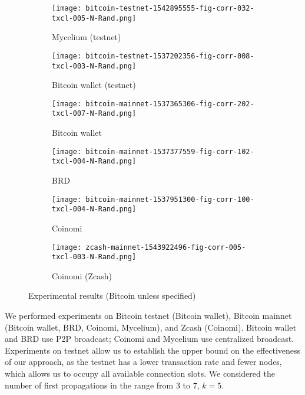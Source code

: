 \begin{figure}
	\centering
	\begin{subfigure}{.5\textwidth}
		\centering
		\texttt{[image: bitcoin-testnet-1542895555-fig-corr-032-txcl-005-N-Rand.png]}
		\caption{Mycelium (testnet)}
	\end{subfigure}%
	\begin{subfigure}{.5\textwidth}
		\centering
		\texttt{[image: bitcoin-testnet-1537202356-fig-corr-008-txcl-003-N-Rand.png]}
		\caption{Bitcoin wallet (testnet)}
	\end{subfigure}
	\begin{subfigure}{.5\textwidth}
		\centering
		\texttt{[image: bitcoin-mainnet-1537365306-fig-corr-202-txcl-007-N-Rand.png]}
		\caption{Bitcoin wallet}
	\end{subfigure}%
	\begin{subfigure}{.5\textwidth}
		\centering
		\texttt{[image: bitcoin-mainnet-1537377559-fig-corr-102-txcl-004-N-Rand.png]}
		\caption{BRD}
	\end{subfigure}
	\begin{subfigure}{.5\textwidth}
		\centering
		\texttt{[image: bitcoin-mainnet-1537951300-fig-corr-100-txcl-004-N-Rand.png]}
		\caption{Coinomi}
	\end{subfigure}%
	\begin{subfigure}{.5\textwidth}
		\centering
		\texttt{[image: zcash-mainnet-1543922496-fig-corr-005-txcl-003-N-Rand.png]}
		\caption{Coinomi (Zcash)}
	\end{subfigure}
	\caption[short]{Experimental results (Bitcoin unless specified)}
	\label{fig:clustering-all}
\end{figure}

We performed experiments on Bitcoin testnet (Bitcoin wallet), Bitcoin mainnet (Bitcoin wallet, BRD, Coinomi, Mycelium), and Zcash (Coinomi).
Bitcoin wallet and BRD use P2P broadcast; Coinomi and Mycelium use centralized broadcast.
Experiments on testnet allow us to establish the upper bound on the effectiveness of our approach, as the testnet has a lower transaction rate and fewer nodes, which allows us to occupy all available connection slots.
We considered the number of first propagations in the range from 3 to 7, $k = 5$.

